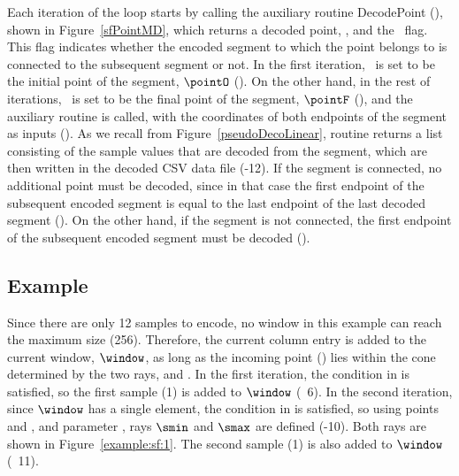 Each iteration of the loop starts by calling the auxiliary routine DecodePoint (), shown in Figure~\ref{sfPointMD}, which returns a decoded point, \pointP, and the \connected\ flag. This flag indicates whether the encoded segment to which the point belongs to is connected to the subsequent segment or not.  In the first iteration, \pointP\ is set to be the initial point of the segment, $\pointO$ (). On the other hand, in the rest of iterations, \pointP\ is set to be the final point of the segment, $\pointF$ (), and the auxiliary routine \decodeSegment is called, with the coordinates of both endpoints of the segment as inputs (). As we recall from Figure~\ref{pseudoDecoLinear}, routine \decodeSegment returns a list consisting of the sample values that are decoded from the segment, which are then written in the decoded CSV data file (-12). If the segment is connected, no additional point must be decoded, since in that case the first endpoint of the subsequent encoded segment is equal to the last endpoint of the last decoded segment (). On the other hand, if the segment is not connected, the first endpoint of the subsequent encoded segment must be decoded ().


\clearpage





\vspace{-5pt}


        


\clearpage
\subsection{Example}
\label{algo:sf:example}


\vspace{+5pt}
\exampleIntro{\ref{example:sf:1}}


Since there are only 12 samples to encode, no window in this example can reach the maximum size (256). Therefore, the current column entry is added to the current window, $\window$, as long as the incoming point (\incoming) lies within the cone determined by the two rays, \smin and \smax. In the first iteration, the condition in  is satisfied, so the first sample (1) is added to $\window$ (\Line~6). In the second iteration, since $\window$ has a single element, the condition in  is satisfied, so using points \snapshot and , and parameter \maxerror, rays $\smin$ and $\smax$ are defined (-10). Both rays are shown in Figure~\ref{example:sf:1}. The second sample (1) is also added to $\window$ (\Line~11). 


